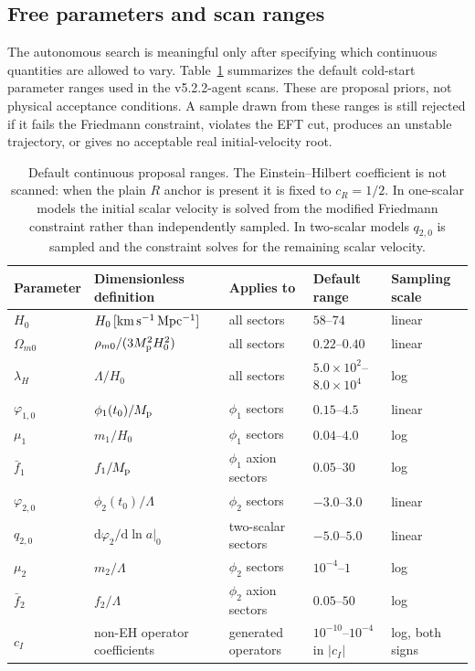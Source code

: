 \documentclass[aps,prd,twocolumn,superscriptaddress,nofootinbib,longbibliography]{revtex4-2}
\newcommand{\dd}{\mathrm{d}}
\newcommand{\Mp}{M_{\rm p}}
\newcommand{\Lam}{\Lambda}
\begin{document}
\subsection{Free parameters and scan ranges}
\label{subsec:parameter-priors}

The autonomous search is meaningful only after specifying which continuous quantities are allowed to vary.  Table~\ref{tab:parameter-priors} summarizes the default cold-start parameter ranges used in the v5.2.2-agent scans.  These are proposal priors, not physical acceptance conditions.  A sample drawn from these ranges is still rejected if it fails the Friedmann constraint, violates the EFT cut, produces an unstable trajectory, or gives no acceptable real initial-velocity root.

\begin{table}[t]
\centering
\begin{ruledtabular}
\begin{tabular}{lllll}
Parameter & Dimensionless definition & Applies to & Default range & Sampling scale \\
\hline
$H_0$ & $H_0\,[{\rm km\,s^{-1}\,Mpc^{-1}}]$ & all sectors & $58$--$74$ & linear \\
$\Omega_{m0}$ & $\rho_{m0}/(3\Mp^2H_0^2)$ & all sectors & $0.22$--$0.40$ & linear \\
$\lambda_H$ & $\Lam/H_0$ & all sectors & $5.0\times10^2$--$8.0\times10^4$ & log \\
$\varphi_{1,0}$ & $\phi_1(t_0)/\Mp$ & $\phi_1$ sectors & $0.15$--$4.5$ & linear \\
$\mu_1$ & $m_1/H_0$ & $\phi_1$ sectors & $0.04$--$4.0$ & log \\
$\bar f_1$ & $f_1/\Mp$ & $\phi_1$ axion sectors & $0.05$--$30$ & log \\
$\varphi_{2,0}$ & $\phi_2(t_0)/\Lam$ & $\phi_2$ sectors & $-3.0$--$3.0$ & linear \\
$q_{2,0}$ & $\dd\varphi_2/\dd\ln a|_{0}$ & two-scalar sectors & $-5.0$--$5.0$ & linear \\
$\mu_2$ & $m_2/\Lam$ & $\phi_2$ sectors & $10^{-4}$--$1$ & log \\
$\bar f_2$ & $f_2/\Lam$ & $\phi_2$ axion sectors & $0.05$--$50$ & log \\
$c_I$ & non-EH operator coefficients & generated operators & $10^{-10}$--$10^{-4}$ in $|c_I|$ & log, both signs \\
\end{tabular}
\end{ruledtabular}
\caption{Default continuous proposal ranges.  The Einstein--Hilbert coefficient is not scanned: when the plain $R$ anchor is present it is fixed to $c_R=1/2$.  In one-scalar models the initial scalar velocity is solved from the modified Friedmann constraint rather than independently sampled.  In two-scalar models $q_{2,0}$ is sampled and the constraint solves for the remaining scalar velocity.}
\label{tab:parameter-priors}
\end{table}
\end{document}
